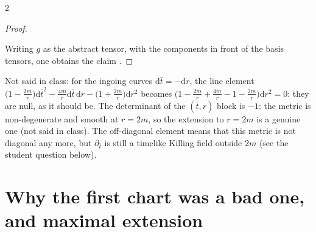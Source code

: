 \begin{paracol}{2}
\begin{proof}
\begin{itemize}
\end{itemize}
Writing $g$ as the abstract tensor, with the components in front of the basis tensors, one obtains the claim .
\end{proof}
\begin{coursenote}
Not said in class: for the ingoing curves $\mathrm d\bar t=-\mathrm dr$, the line element $\bigl(1-\frac{2m}r\bigr)\mathrm d\bar t^2-\frac{4m}r\mathrm d\bar t\,\mathrm dr-\bigl(1+\frac{2m}r\bigr)\mathrm dr^2$ becomes $\bigl(1-\frac{2m}r+\frac{4m}r-1-\frac{2m}r\bigr)\mathrm dr^2=0$: they are null, as it should be. The determinant of the $(\bar t,r)$ block is $-1$: the metric is non-degenerate and smooth at $r=2m$, so the extension to $r=2m$ is a genuine one (not said in class). The off-diagonal element means that this metric is not diagonal any more, but $\partial_{\bar t}$ is still a timelike Killing field outside $2m$ (see the student question below).
\end{coursenote}

\section{Why the first chart was a bad one, and maximal extension}\label{sec:c22-ext}


\end{paracol}
